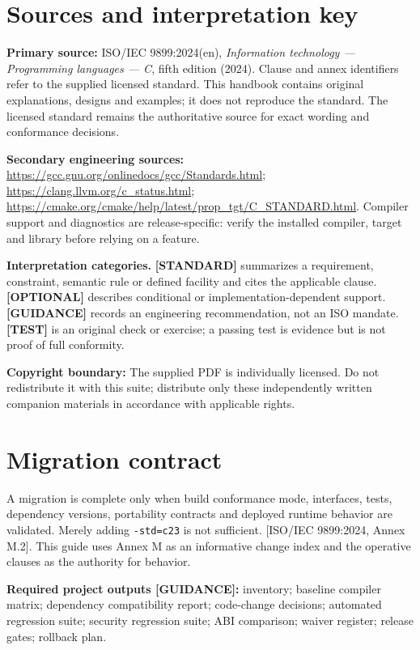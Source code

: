 \documentclass[10pt,letterpaper,oneside]{report}
\newcommand{\refcl}[1]{\textsf{\footnotesize[ISO/IEC 9899:2024, #1]}}
\begin{document}
\chapter*{Sources and interpretation key}
\textbf{Primary source:} ISO/IEC 9899:2024(en), \emph{Information technology --- Programming languages --- C}, fifth edition (2024). Clause and annex identifiers refer to the supplied licensed standard. This handbook contains original explanations, designs and examples; it does not reproduce the standard. The licensed standard remains the authoritative source for exact wording and conformance decisions.\par
\textbf{Secondary engineering sources:} \url{https://gcc.gnu.org/onlinedocs/gcc/Standards.html}; \url{https://clang.llvm.org/c_status.html}; \url{https://cmake.org/cmake/help/latest/prop_tgt/C_STANDARD.html}. Compiler support and diagnostics are release-specific: verify the installed compiler, target and library before relying on a feature.\par
\begin{keybox}\textbf{Interpretation categories.} \textbf{[STANDARD]} summarizes a requirement, constraint, semantic rule or defined facility and cites the applicable clause. \textbf{[OPTIONAL]} describes conditional or implementation-dependent support. \textbf{[GUIDANCE]} records an engineering recommendation, not an ISO mandate. \textbf{[TEST]} is an original check or exercise; a passing test is evidence but is not proof of full conformity.\end{keybox}
\textbf{Copyright boundary:} The supplied PDF is individually licensed. Do not redistribute it with this suite; distribute only these independently written companion materials in accordance with applicable rights.\par


\chapter{Migration contract}
A migration is complete only when build conformance mode, interfaces, tests, dependency versions, portability contracts and deployed runtime behavior are validated. Merely adding \texttt{-std=c23} is not sufficient. \refcl{Annex M.2}. This guide uses Annex M as an informative change index and the operative clauses as the authority for behavior.
\begin{keybox}\textbf{Required project outputs [GUIDANCE]:} inventory; baseline compiler matrix; dependency compatibility report; code-change decisions; automated regression suite; security regression suite; ABI comparison; waiver register; release gates; rollback plan.\end{keybox}
\end{document}
